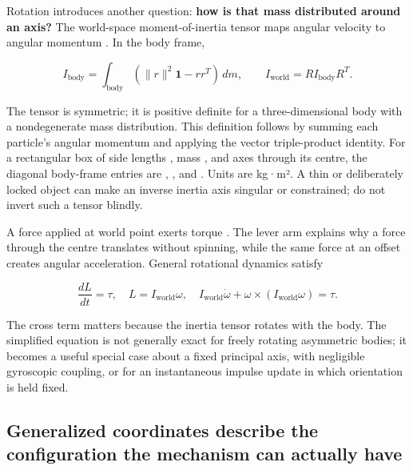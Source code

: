 Rotation introduces another question: \textbf{how is that mass distributed around an axis?} The world-space moment-of-inertia tensor  maps angular velocity to angular momentum . In the body frame,

\[
I_{\mathrm{body}}=\int_{\mathrm{body}}(\|r\|^2\mathbf{1}-rr^T)\,dm,
\qquad I_{\mathrm{world}}=R I_{\mathrm{body}}R^T.
\]

The tensor is symmetric; it is positive definite for a three-dimensional body with a nondegenerate mass distribution. This definition follows by summing each particle's angular momentum  and applying the vector triple-product identity. For a rectangular box of side lengths , mass , and axes through its centre, the diagonal body-frame entries are , , and . Units are kg·m². A thin or deliberately locked object can make an inverse inertia axis singular or constrained; do not invert such a tensor blindly.

A force  applied at world point  exerts torque . The lever arm explains why a force through the centre translates without spinning, while the same force at an offset creates angular acceleration. General rotational dynamics satisfy

\[
\frac{dL}{dt}=\tau,\quad L=I_{\mathrm{world}}\omega,\quad
I_{\mathrm{world}}\dot\omega+\omega\times(I_{\mathrm{world}}\omega)=\tau .
\]

The cross term matters because the inertia tensor rotates with the body. The simplified equation  is not generally exact for freely rotating asymmetric bodies; it becomes a useful special case about a fixed principal axis, with negligible gyroscopic coupling, or for an instantaneous impulse update in which orientation is held fixed.

\subsection{Generalized coordinates describe the configuration the mechanism can actually have}\label{06-engine-ii-ch033-generalized-coordinates-describe-the-configuration-the-mechanism-can-actually-have}

